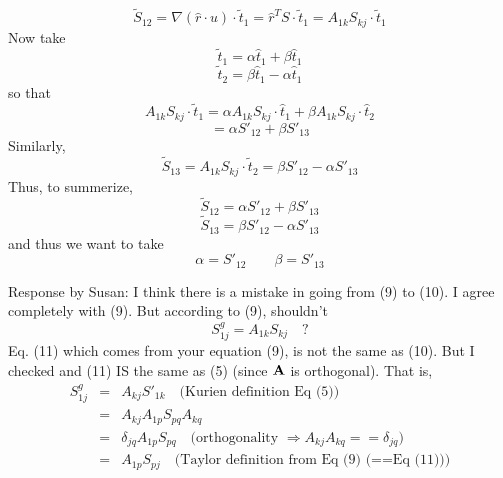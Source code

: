 \documentclass[12pt]{article}
\begin{document}
\begin{equation}
{\tilde S}_{12} = \nabla (\hat r \cdot u) \cdot {\tilde t}_1
= \hat r^T  S \cdot {\tilde t}_1 
= A_{1k} S_{kj} \cdot {\tilde t}_1 
\end{equation}
Now take
\[
   {\tilde t}_1  = \alpha {\hat t}_1 + \beta {\hat t}_1
\]
\[
   {\tilde t}_2  = \beta {\hat t}_1 - \alpha {\hat t}_1
\]
so that
\begin{equation}
A_{1k} S_{kj} \cdot {\tilde t}_1  = 
\alpha A_{1k} S_{kj} \cdot {\hat t}_1  + 
\beta A_{1k} S_{kj} \cdot {\hat t}_2
\end{equation}
\begin{equation}
 = \alpha S'_{12}  + \beta S'_{13} 
\end{equation}
Similarly,
\[
{\tilde S}_{13} = A_{1k} S_{kj} \cdot {\tilde t}_2  = 
\beta S'_{12}  - \alpha S'_{13} 
\]
Thus, to summerize, 
\[
{\tilde S}_{12} = \alpha S'_{12}  + \beta S'_{13} 
\]
\[
{\tilde S}_{13} = \beta S'_{12}  - \alpha S'_{13} 
\]
and thus we want to take
\[
  \alpha = S'_{12}  \qquad \beta = S'_{13}
\]


Response by Susan:
   I think there is a mistake in going from (9) to (10). I agree completely with (9). But according to (9), shouldn't 
\begin{equation}S^g_{1j} = A_{1k} S_{kj}\quad ?\end{equation}
Eq. (11) which comes from your equation (9), is not the same as
(10). But I checked and (11) IS the same as (5) (since ${\bf A}$ is
orthogonal). That is,
\begin{eqnarray}S^g_{1j} &=& A_{kj} S'_{1k} \quad \mbox{(Kurien definition Eq (5))} \\
&=& A_{kj} A_{1p} S_{pq} A_{kq} \\
&=& \delta_{jq} A_{1p} S_{pq} \quad \mbox{(orthogonality $\Rightarrow A_{kj}A_{kq} == \delta_{jq}$)} \\ 
&=& A_{1p} S_{pj} \quad \mbox{(Taylor definition from Eq (9) (==Eq (11)))} 
\end{eqnarray}
\end{document}
